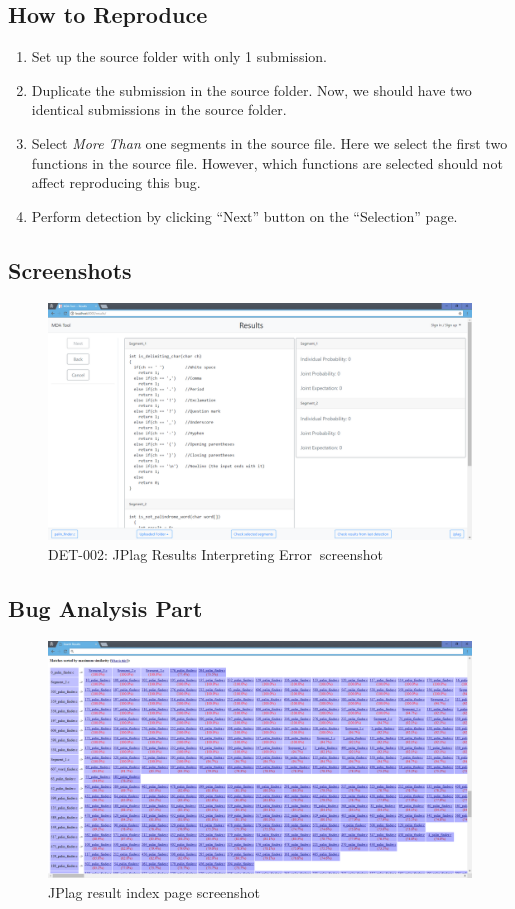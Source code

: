 \documentclass[twoside,a4paper]{refart}
\newcommand{\bugsecond}{DET-002: JPlag Results Interpreting Error}
\begin{document}
\subsection*{How to Reproduce}
\begin{enumerate}
\item Set up the source folder with only 1 submission.
\item Duplicate the submission in the source folder. Now, we should have two identical submissions in the source folder.
\item Select \emph{More Than} one segments in the source file. Here we select the first two functions in the source file. However, which functions are selected should not affect reproducing this bug.
\item Perform detection by clicking \enquote{Next} button on the \enquote{Selection} page.
\end{enumerate}

\subsection*{Screenshots}
\begin{figure}[!h]
\centering
\includegraphics[width=12cm]{img/bug2.png}
\caption{\bugsecond $\ $ screenshot}
\label{fig:bug2_1}
\end{figure}

\subsection{Bug Analysis Part}
\begin{figure}[!h]
\centering
\includegraphics[width=12cm]{img/JPlag_1.png}
\caption{JPlag result index page screenshot}
\label{fig:bug2_ana_1}
\end{figure}
\end{document}
